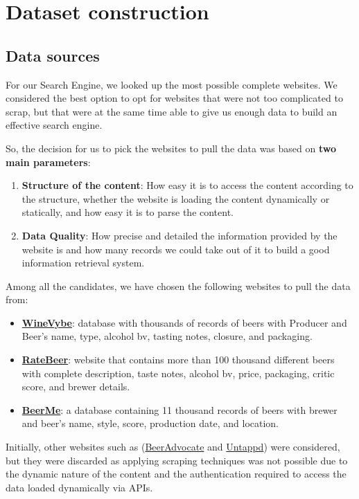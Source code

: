 \section{Dataset construction}
\label{sec:dataset}

\subsection{Data sources}

For our Search Engine, we looked up the most possible complete websites. We considered the best option to opt for websites that were not too complicated to scrap, but that were at the same time able to give us enough data to build an effective search engine.

So, the decision for us to pick the websites to pull the data was based on \textbf{two main parameters}:

\begin{enumerate}
  \item \textbf{Structure of the content}: How easy it is to access the content according to the structure, whether the website is loading the content dynamically or statically, and how easy it is to parse the content.
  \item \textbf{Data Quality}: How precise and detailed the information provided by the website is and how many records we could take out of it to build a good information retrieval system.
\end{enumerate}

Among all the candidates, we have chosen the following websites to pull the data from:

\begin{itemize}
  \item \href{https://winevybe.com/}{\textbf{WineVybe}}: database with thousands of records of beers with Producer and Beer's name, type, alcohol bv, tasting notes, closure, and packaging.
  \item \href{https://www.ratebeer.com/}{\textbf{RateBeer}}: website that contains more than 100 thousand different beers with complete description, taste notes, alcohol bv, price, packaging, critic score, and brewer details.
  \item \href{https://beerme.com/beerlist.php}{\textbf{BeerMe}}: a database containing 11 thousand records of beers with brewer and beer's name, style, score, production date, and location.
\end{itemize}

Initially, other websites such as (\href{https://www.beeradvocate.com/}{BeerAdvocate} and \href{https://untappd.com/}{Untappd}) were considered, but they were discarded as applying scraping techniques was not possible due to the dynamic nature of the content and the authentication required to access the data loaded dynamically via APIs.


